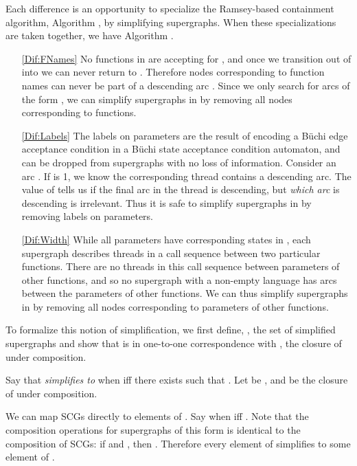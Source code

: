 \documentclass{LMCS}
\newcommand\buchi{B\"uchi }
\begin{document}
Each difference is an opportunity to specialize the Ramsey-based containment
algorithm, Algorithm \SGS, by simplifying supergraphs.
When these specializations are taken together, we have Algorithm \LJB.

\begin{enumerate}[(1)]
\item[{\ref{Dif:FNames}}] No functions in  are accepting for , and
once we transition out of  into  we can never return to . Therefore
nodes  corresponding to function names can never be part of a descending arc
. Since we only search for arcs of the form , we can
simplify supergraphs in  by removing all nodes corresponding to
functions. 

\item[{\ref{Dif:Labels}}] The labels on parameters are the result of encoding a \buchi
edge acceptance condition in a \buchi state acceptance condition automaton, and
can be dropped from supergraphs with no loss of information.  Consider an arc
. If  is 1, we know the corresponding thread
contains a descending arc. The value of  tells us if the final arc in the
thread is descending, but \emph{which arc} is descending is irrelevant.  Thus it is
safe to simplify supergraphs in  by removing labels on parameters.


\item[{\ref{Dif:Width}}] While all parameters have corresponding states in
, each supergraph describes threads in a call sequence between two
particular functions.  There are no threads in this call sequence between
parameters of other functions, and so no supergraph with a non-empty language
has arcs between the parameters of other functions. We can thus simplify
supergraphs in  by removing all nodes corresponding to parameters of
other functions.
\end{enumerate}

To formalize this notion of simplification, we first define, , the set of
simplified supergraphs and show that  is in
one-to-one correspondence with , the closure of  under composition.

\begin{defi}\label{ReducedSgraph}
 
\end{defi}

Say that \emph{
simplifies to } when  iff there exists  such that
.  Let  be
, and  be the
closure of  under composition. 

We can map SCGs directly to elements of .  Say  when  iff . Note that the composition operations for
supergraphs of this form is identical to the composition of SCGs: if  and , then .  Therefore every element of  simplifies to
some element of .
\end{document}

